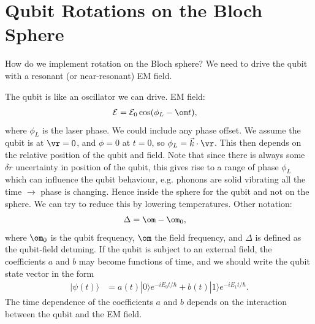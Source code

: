 \documentclass[a4paper, 11pt, normalem]{report}
\begin{document}
\chapter{Qubit Rotations on the Bloch Sphere}
How do we implement rotation on the Bloch sphere?
We need to drive the qubit with a resonant (or near-resonant) EM field.
\begin{figure}[H]
    \centering
\end{figure}
The qubit is like an oscillator we can drive.
EM field:
\begin{align}
    \mathcal{E} &= \mathcal{E}_0\cos(\phi_L-\om t),
\end{align}
where $\phi_L$ is the laser phase.
We could include any phase offset.
We assume the qubit is at $\vr=0$, and $\phi=0$ at $t=0$, so $\phi_L=\vec{k}\cdot\vr$.
This then depends on the relative position of the qubit and field.
Note that since there is always some $\delta r$ uncertainty in position of the qubit, this gives rise to a range of phase $\phi_L$ which can influence the qubit behaviour, e.g. phonons are solid vibrating all the time $\to$ phase is changing.
Hence inside the sphere for the qubit and not on the sphere.
We can try to reduce this by lowering temperatures.
Other notation:
\begin{align}
    \Delta &= \om-\om_0,
\end{align}
where $\om_0$ is the qubit frequency, $\om$ the field frequency, and $\Delta$ is defined as the qubit-field detuning.
If the qubit is subject to an external field, the coefficients $a$ and $b$ may become functions of time, and we should write the qubit state vector in the form
\begin{align}
    |\psi(t)\rangle &= a(t)|0\rangle e^{-iE_0t/\hbar} + b(t)|1\rangle e^{-iE_1t/\hbar}.
\end{align}
The time dependence of the coefficients $a$ and $b$ depends on the interaction between the qubit and the EM field.
\end{document}
